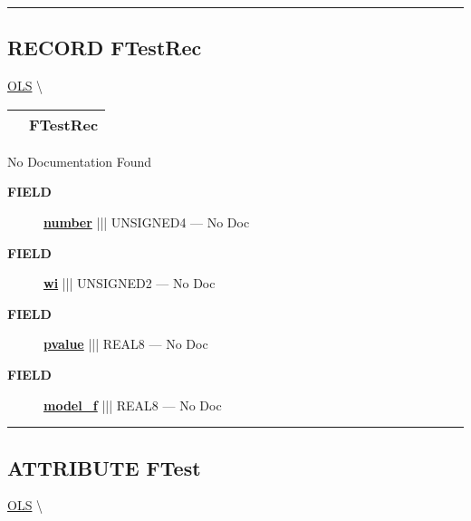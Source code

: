 \rule{\linewidth}{0.5pt}
\subsection*{\textsf{\colorbox{headtoc}{\color{white} RECORD}
FTestRec}}

\hypertarget{ecldoc:linearregression.ols.ftestrec}{}
\hspace{0pt} \hyperlink{ecldoc:linearregression.ols}{OLS} \textbackslash 

{\renewcommand{\arraystretch}{1.5}
\begin{tabularx}{\textwidth}{|>{\raggedright\arraybackslash}l|X|}
\hline
\hspace{0pt}\mytexttt{\color{red} } & \textbf{FTestRec} \\
\hline
\end{tabularx}
}

\par





No Documentation Found







\par
\begin{description}
\item [\colorbox{tagtype}{\color{white} \textbf{\textsf{FIELD}}}] \textbf{\underline{number}} ||| UNSIGNED4 --- No Doc
\item [\colorbox{tagtype}{\color{white} \textbf{\textsf{FIELD}}}] \textbf{\underline{wi}} ||| UNSIGNED2 --- No Doc
\item [\colorbox{tagtype}{\color{white} \textbf{\textsf{FIELD}}}] \textbf{\underline{pvalue}} ||| REAL8 --- No Doc
\item [\colorbox{tagtype}{\color{white} \textbf{\textsf{FIELD}}}] \textbf{\underline{model\_f}} ||| REAL8 --- No Doc
\end{description}





\rule{\linewidth}{0.5pt}
\subsection*{\textsf{\colorbox{headtoc}{\color{white} ATTRIBUTE}
FTest}}

\hypertarget{ecldoc:linearregression.ols.ftest}{}
\hspace{0pt} \hyperlink{ecldoc:linearregression.ols}{OLS} \textbackslash 

